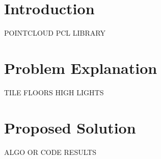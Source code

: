 \section{Introduction}

POINTCLOUD 
PCL LIBRARY
\newpage
\section{Problem Explanation}
\newpage
TILE FLOORS 
HIGH LIGHTS

\newpage
\section{Proposed Solution}
ALGO OR CODE 
RESULTS